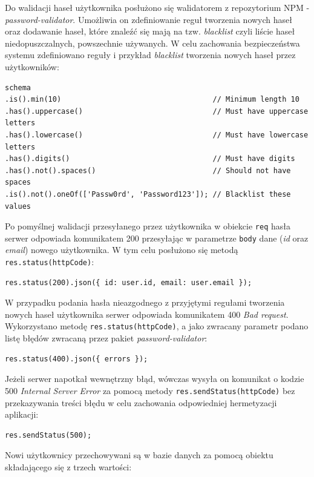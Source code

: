 Do walidacji haseł użytkownika posłużono się walidatorem z repozytorium NPM - \textit{password-validator}. Umożliwia on zdefiniowanie reguł tworzenia nowych haseł oraz dodawanie haseł, które znaleźć się mają na tzw. \textit{blacklist} czyli liście haseł niedopuszczalnych, powszechnie używanych. W celu zachowania bezpieczeństwa systemu zdefiniowano reguły i przykład \textit{blacklist} tworzenia nowych haseł przez użytkowników:

\begin{verbatim}
schema
.is().min(10)                                   // Minimum length 10
.has().uppercase()                              // Must have uppercase letters
.has().lowercase()                              // Must have lowercase letters
.has().digits()                                 // Must have digits
.has().not().spaces()                           // Should not have spaces
.is().not().oneOf(['Passw0rd', 'Password123']); // Blacklist these values
\end{verbatim}

Po pomyślnej walidacji przesyłanego przez użytkownika w obiekcie \texttt{req} hasła serwer odpowiada komunikatem 200 przesyłając w parametrze \texttt{body} dane (\textit{id} oraz \textit{email}) nowego użytkownika. W tym celu posłużono się metodą \texttt{res.status(httpCode)}:

\begin{verbatim}
res.status(200).json({ id: user.id, email: user.email });
\end{verbatim}

W przypadku podania hasła nieazgodnego z przyjętymi regułami tworzenia nowych haseł użytkownika serwer odpowiada komunikatem 400 \textit{Bad request}. Wykorzystano metodę \texttt{res.status(httpCode)}, a jako zwracany parametr podano listę błędów zwracaną przez pakiet \textit{password-validator}:

\begin{verbatim}
res.status(400).json({ errors });
\end{verbatim}

Jeżeli serwer napotkał wewnętrzny błąd, wówczas wysyła on komunikat o kodzie 500 \textit{Internal Server Error} za pomocą metody \texttt{res.sendStatus(httpCode)} bez przekazywania treści błędu w celu zachowania odpowiedniej hermetyzacji aplikacji:

\begin{verbatim}
res.sendStatus(500);
\end{verbatim}

Nowi użytkownicy przechowywani są w bazie danych za pomocą obiektu składającego się z trzech wartości:

